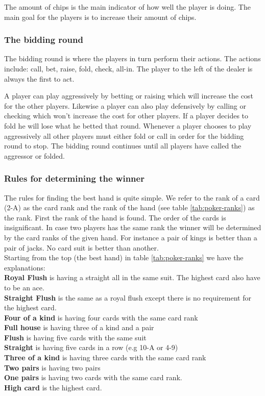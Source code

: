 The amount of chips is the main indicator of how well the player is doing. The main goal for the players is to increase their amount of chips.

\subsubsection*{The bidding round}
The bidding round is where the players in turn perform their actions. The actions include: call, bet, raise, fold, check, all-in. The player to the left of the dealer is always the first to act.

A player can play aggressively by betting or raising which will increase the cost for the other players. Likewise a player can also play defensively by calling or checking which won't increase the cost for other players. If a player decides to fold he will lose what he betted that round. Whenever a player chooses to play aggressively all other players must either fold or call in order for the bidding round to stop. The bidding round continues until all players have called the aggressor or folded.

\subsubsection*{Rules for determining the winner}
The rules for finding the best hand is quite simple. We refer to the rank of a card (2-A) as the card rank and the rank of the hand (see table \ref{tab:poker-ranks}) as the rank. First the rank of the hand is found. The order of the cards is insignificant. In case two players has the same rank the winner will be determined by the card ranks of the given hand. For instance a pair of kings is better than a pair of jacks. No card suit is better than another. \\

Starting from the top (the best hand) in table \ref{tab:poker-ranks} we have the explanations:\\
\textbf{Royal Flush} is having a straight all in the same suit. The highest card also have to be an ace.\\
\textbf{Straight Flush} is the same as a royal flush except there is no requirement for the highest card.\\
\textbf{Four of a kind} is having four cards with the same card rank \\
\textbf{Full house} is having three of a kind and a pair\\
\textbf{Flush} is having five cards with the same suit\\
\textbf{Straight} is having five cards in a row (e.g 10-A or 4-9)\\
\textbf{Three of a kind} is having three cards with the same card rank \\
\textbf{Two pairs} is having two pairs\\
\textbf{One pairs} is having two cards with the same card rank. \\
\textbf{High card} is the highest card. \\

